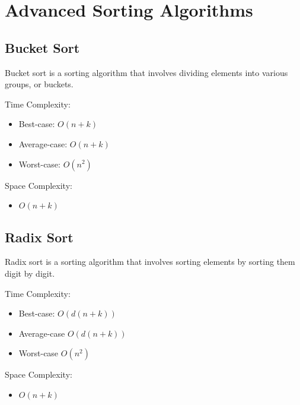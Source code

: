 \chapter{Advanced Sorting Algorithms}

\section{Bucket Sort}
Bucket sort is a sorting algorithm that involves dividing elements into various groups, or buckets. 

Time Complexity:

\begin{itemize}
  \item Best-case: $O(n + k)$
  \item Average-case: $O(n + k)$
  \item Worst-case: $O(n^{2})$
\end{itemize}

Space Complexity:

\begin{itemize}
    \item $O(n + k)$
\end{itemize}

\section{Radix Sort}
Radix sort is a sorting algorithm that involves sorting elements by sorting them digit by digit.

Time Complexity:

\begin{itemize}
    \item Best-case: $O(d(n + k))$
    \item Average-case $O(d(n + k))$
    \item Worst-case $O(n^{2})$
\end{itemize}

Space Complexity:

\begin{itemize}
    \item $O(n + k)$
\end{itemize}

